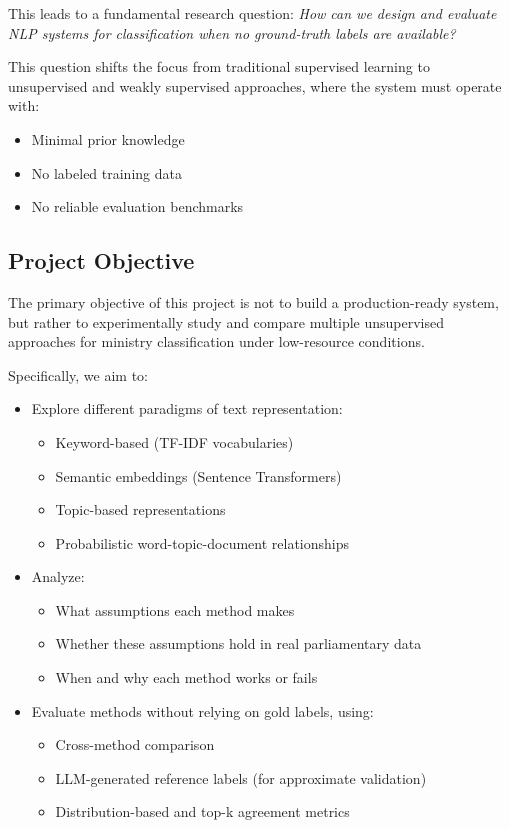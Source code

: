 \documentclass{report}
\begin{document}
This leads to a fundamental research question: \textit{How can we design and evaluate NLP systems for classification when no ground-truth labels are available?}

This question shifts the focus from traditional supervised learning to unsupervised and weakly supervised approaches, where the system must operate with:
\begin{itemize}
    \item Minimal prior knowledge
    \item No labeled training data
    \item No reliable evaluation benchmarks
\end{itemize}

\subsection{Project Objective}
The primary objective of this project is not to build a production-ready system, but rather to experimentally study and compare multiple unsupervised approaches for ministry classification under low-resource conditions.

Specifically, we aim to:
\begin{itemize}
    \item Explore different paradigms of text representation:
        \begin{itemize}
            \item Keyword-based (TF-IDF vocabularies)
            \item Semantic embeddings (Sentence Transformers)
            \item Topic-based representations
            \item Probabilistic word-topic-document relationships
        \end{itemize}
    \item Analyze:
        \begin{itemize}
            \item What assumptions each method makes
            \item Whether these assumptions hold in real parliamentary data
            \item When and why each method works or fails
        \end{itemize}
    \item Evaluate methods without relying on gold labels, using:
        \begin{itemize}
            \item Cross-method comparison
            \item LLM-generated reference labels (for approximate validation)
            \item Distribution-based and top-k agreement metrics
        \end{itemize}
\end{itemize}
\end{document}
